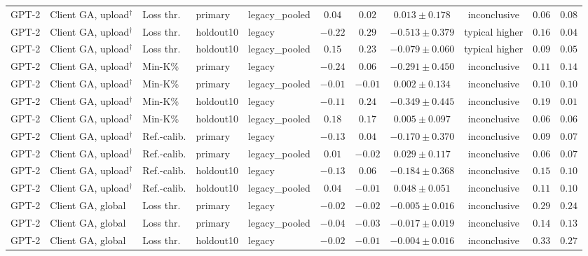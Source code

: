 {\begin{longtable}{@{\extracolsep{\fill}}lllllcccccc@{}}
GPT-2 & Client GA, upload$^{\dagger}$ & Loss thr. & primary & legacy\_pooled & $0.04$ & $0.02$ & $0.013 \pm 0.178$ & inconclusive & $0.06$ & $0.08$ \\
GPT-2 & Client GA, upload$^{\dagger}$ & Loss thr. & holdout10 & legacy & $-0.22$ & $0.29$ & $-0.513 \pm 0.379$ & typical higher & $0.16$ & $0.04$ \\
GPT-2 & Client GA, upload$^{\dagger}$ & Loss thr. & holdout10 & legacy\_pooled & $0.15$ & $0.23$ & $-0.079 \pm 0.060$ & typical higher & $0.09$ & $0.05$ \\
GPT-2 & Client GA, upload$^{\dagger}$ & Min-K\% & primary & legacy & $-0.24$ & $0.06$ & $-0.291 \pm 0.450$ & inconclusive & $0.11$ & $0.14$ \\
GPT-2 & Client GA, upload$^{\dagger}$ & Min-K\% & primary & legacy\_pooled & $-0.01$ & $-0.01$ & $0.002 \pm 0.134$ & inconclusive & $0.10$ & $0.10$ \\
GPT-2 & Client GA, upload$^{\dagger}$ & Min-K\% & holdout10 & legacy & $-0.11$ & $0.24$ & $-0.349 \pm 0.445$ & inconclusive & $0.19$ & $0.01$ \\
GPT-2 & Client GA, upload$^{\dagger}$ & Min-K\% & holdout10 & legacy\_pooled & $0.18$ & $0.17$ & $0.005 \pm 0.097$ & inconclusive & $0.06$ & $0.06$ \\
GPT-2 & Client GA, upload$^{\dagger}$ & Ref.-calib. & primary & legacy & $-0.13$ & $0.04$ & $-0.170 \pm 0.370$ & inconclusive & $0.09$ & $0.07$ \\
GPT-2 & Client GA, upload$^{\dagger}$ & Ref.-calib. & primary & legacy\_pooled & $0.01$ & $-0.02$ & $0.029 \pm 0.117$ & inconclusive & $0.06$ & $0.07$ \\
GPT-2 & Client GA, upload$^{\dagger}$ & Ref.-calib. & holdout10 & legacy & $-0.13$ & $0.06$ & $-0.184 \pm 0.368$ & inconclusive & $0.15$ & $0.10$ \\
GPT-2 & Client GA, upload$^{\dagger}$ & Ref.-calib. & holdout10 & legacy\_pooled & $0.04$ & $-0.01$ & $0.048 \pm 0.051$ & inconclusive & $0.11$ & $0.10$ \\
GPT-2 & Client GA, global & Loss thr. & primary & legacy & $-0.02$ & $-0.02$ & $-0.005 \pm 0.016$ & inconclusive & $0.29$ & $0.24$ \\
GPT-2 & Client GA, global & Loss thr. & primary & legacy\_pooled & $-0.04$ & $-0.03$ & $-0.017 \pm 0.019$ & inconclusive & $0.14$ & $0.13$ \\
GPT-2 & Client GA, global & Loss thr. & holdout10 & legacy & $-0.02$ & $-0.01$ & $-0.004 \pm 0.016$ & inconclusive & $0.33$ & $0.27$ \\

\end{longtable}}
